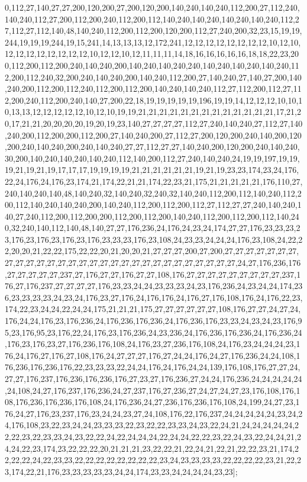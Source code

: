 0,112,27,140,27,27,200,120,200,27,200,120,200,140,240,140,240,112,200,27,112,240,140,240,112,27,200,112,200,240,112,200,112,140,240,140,240,140,240,140,240,112,27,112,27,112,140,48,140,240,112,200,112,200,120,200,112,27,240,200,32,23,15,19,19,244,19,19,19,244,19,15,241,14,13,13,13,12,172,241,12,12,12,12,12,12,12,12,10,12,10,12,12,12,12,12,12,12,12,10,12,12,10,12,11,11,11,14,18,16,16,16,16,16,18,18,22,23,200,112,200,112,200,240,140,240,200,140,240,140,240,240,140,240,140,240,140,240,112,200,112,240,32,200,240,140,240,200,140,240,112,200,27,140,240,27,140,27,200,140,240,200,112,200,112,240,112,200,112,200,140,240,140,240,112,27,112,200,112,27,112,200,240,112,200,240,140,27,200,22,18,19,19,19,19,19,196,19,19,14,12,12,12,10,10,10,13,13,12,12,12,12,12,10,12,10,19,19,21,21,21,21,21,21,21,21,21,21,21,21,21,17,21,20,17,21,21,20,20,20,20,19,20,19,23,140,27,27,27,27,112,27,240,140,240,27,112,27,140,240,200,112,200,200,112,200,27,140,240,200,27,112,27,200,120,200,240,140,200,120,200,240,140,240,200,240,140,240,27,27,112,27,27,140,240,200,120,200,240,140,240,30,200,140,240,140,240,140,240,112,140,200,112,27,240,140,240,24,19,19,197,19,19,19,21,19,21,19,17,17,17,19,19,19,19,21,21,21,21,21,21,19,21,19,23,23,174,23,24,176,22,24,176,24,176,23,174,21,174,22,21,21,174,22,23,21,175,21,21,21,21,21,176,110,27,240,140,240,140,48,140,240,32,140,240,32,240,32,140,240,112,200,112,140,240,112,200,112,140,240,140,240,200,140,240,112,200,112,200,112,27,112,27,27,240,140,240,140,27,240,112,200,112,200,200,112,200,112,200,140,240,112,200,112,200,112,140,240,32,240,140,112,140,48,140,27,27,176,236,24,176,24,23,24,174,27,27,176,23,23,23,23,176,23,176,23,176,23,176,23,23,23,176,23,108,24,23,23,24,24,24,176,23,108,24,22,22,20,20,21,22,22,175,22,22,20,21,20,20,21,27,27,27,200,27,200,27,27,27,27,27,27,27,27,27,27,27,27,27,27,27,27,27,27,27,27,27,27,27,27,27,27,27,27,27,24,27,176,236,176,27,27,27,27,27,237,27,176,27,27,176,27,27,108,176,27,27,27,27,27,27,27,27,27,237,176,27,176,237,27,27,27,27,176,23,23,24,24,23,23,23,24,23,176,236,24,23,24,24,174,236,23,23,23,23,24,23,24,176,23,27,176,24,176,176,24,176,27,176,108,176,24,176,22,23,174,22,23,24,24,22,24,24,175,21,21,21,175,27,27,27,27,27,27,108,176,27,27,24,27,24,176,24,24,176,23,176,236,24,176,236,176,236,24,176,236,176,23,23,24,23,24,23,176,95,23,176,95,23,176,22,24,176,23,176,236,24,23,236,24,176,236,176,236,24,176,236,24,176,23,176,23,27,176,236,176,108,24,176,23,27,236,176,108,24,176,23,24,24,24,23,176,24,176,27,176,27,108,176,24,27,27,27,176,27,24,24,176,24,27,176,236,24,24,108,176,236,176,236,176,22,23,23,23,22,24,24,176,24,176,24,24,139,176,108,176,27,27,24,27,27,176,237,176,236,176,236,176,27,23,27,176,236,27,24,24,176,236,24,24,24,24,24,24,108,24,27,176,237,176,236,24,27,237,176,27,236,27,24,27,24,27,23,176,108,176,108,176,236,176,236,176,108,24,176,236,24,27,236,176,236,176,108,24,199,24,27,23,176,24,27,176,23,237,176,23,24,24,23,27,24,108,176,22,176,237,24,24,24,24,24,23,24,24,176,108,23,22,23,24,24,23,23,23,22,23,22,22,23,23,24,23,22,24,21,24,24,24,24,24,22,22,23,22,23,23,24,23,22,22,24,22,24,24,24,22,24,24,22,22,23,22,24,23,22,24,24,21,24,24,22,23,174,23,22,22,22,20,21,21,21,23,22,22,21,22,24,21,22,21,22,22,23,21,174,22,22,22,24,22,23,23,22,22,22,22,22,22,22,22,23,24,23,23,23,23,22,22,22,22,23,21,22,23,174,22,21,176,23,23,23,23,23,24,24,174,23,23,24,24,24,24,23,23];

